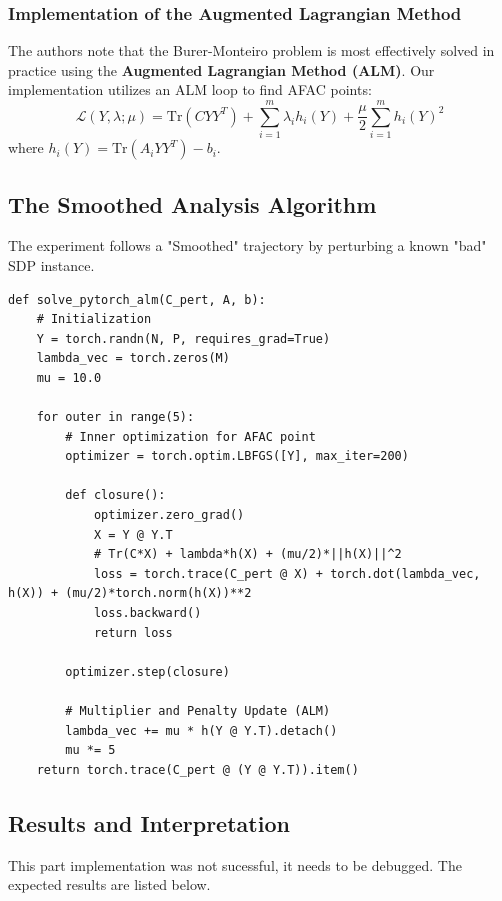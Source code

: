 \subsubsection{Implementation of the Augmented Lagrangian Method}
The authors note that the Burer-Monteiro problem is most effectively solved in practice using the \textbf{Augmented Lagrangian Method (ALM)}. Our implementation utilizes an ALM loop to find AFAC points:
\begin{equation}
    \mathcal{L}(Y, \lambda; \mu) = \text{Tr}(C YY^T) + \sum_{i=1}^m \lambda_i h_i(Y) + \frac{\mu}{2} \sum_{i=1}^m h_i(Y)^2
\end{equation}
where $h_i(Y) = \text{Tr}(A_i YY^T) - b_i$.

\subsection{The Smoothed Analysis Algorithm}
The experiment follows a "Smoothed" trajectory by perturbing a known "bad" SDP instance.

\begin{lstlisting}[caption={Augmented Lagrangian with Smoothed Perturbation}]
def solve_pytorch_alm(C_pert, A, b):
    # Initialization
    Y = torch.randn(N, P, requires_grad=True)
    lambda_vec = torch.zeros(M)
    mu = 10.0
    
    for outer in range(5):
        # Inner optimization for AFAC point
        optimizer = torch.optim.LBFGS([Y], max_iter=200)
        
        def closure():
            optimizer.zero_grad()
            X = Y @ Y.T
            # Tr(C*X) + lambda*h(X) + (mu/2)*||h(X)||^2
            loss = torch.trace(C_pert @ X) + torch.dot(lambda_vec, h(X)) + (mu/2)*torch.norm(h(X))**2
            loss.backward()
            return loss
            
        optimizer.step(closure)
        
        # Multiplier and Penalty Update (ALM)
        lambda_vec += mu * h(Y @ Y.T).detach()
        mu *= 5 
    return torch.trace(C_pert @ (Y @ Y.T)).item()
\end{lstlisting}

\subsection{Results and Interpretation}
    This part implementation was not sucessful, it needs to be debugged. The expected results are listed below.


